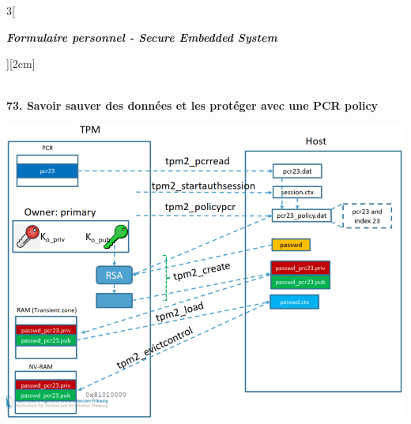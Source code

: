 \begin{multicols}{3}[\centerline{ \large\em \textbf{Formulaire personnel - Secure Embedded System}}][2cm]
\begin{minipage}{\linewidth}
\end{minipage}
\\ \textbf{73. Savoir sauver des données et les protéger avec une PCR policy\\}
\begin{minipage}{\linewidth}
	\centering
    \includegraphics[width =0.5\columnwidth]{images/51.png}
\end{minipage}

\end{multicols}
